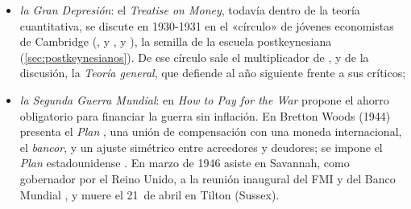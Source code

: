 \documentclass[11pt]{article}
\begin{document}
\begin{itemize}
\begin{itemize}
\begin{itemize}
  \item \emph{la Gran Depresión}: el \emph{Treatise on Money}\nocite{Keynes1930Treatise}, todavía dentro de la teoría cuantitativa, se discute en 1930-1931 en el «círculo» de jóvenes economistas de Cambridge (,  y ,  y ), la semilla de la escuela postkeynesiana (\ref{sec:postkeynesianos}). De ese círculo sale el multiplicador de \textcite{Kahn1931Relation}, y de la discusión, la \emph{Teoría general}\nocite{Keynes1936}, que  defiende al año siguiente frente a sus críticos\nocite{Keynes1937General};
  \item \emph{la Segunda Guerra Mundial}: en \emph{How to Pay for the War}\nocite{Keynes1940How} propone el ahorro obligatorio para financiar la guerra sin inflación. En Bretton Woods (1944) presenta el \emph{Plan }, una unión de compensación con una moneda internacional, el \emph{bancor}, y un ajuste simétrico entre acreedores y deudores; se impone el \emph{Plan } estadounidense . En marzo de 1946 asiste en Savannah, como gobernador por el Reino Unido, a la reunión inaugural del FMI y del Banco Mundial\nocite{Hansard1946Savannah} , y muere el 21~de abril en Tilton (Sussex).
  \end{itemize}
  \end{itemize}
\end{itemize}

\begin{infografia}[H]
\centering
\caption{La vida de  (1883-1946)}\label{figu:cronologia}
\end{infografia}
\end{document}
